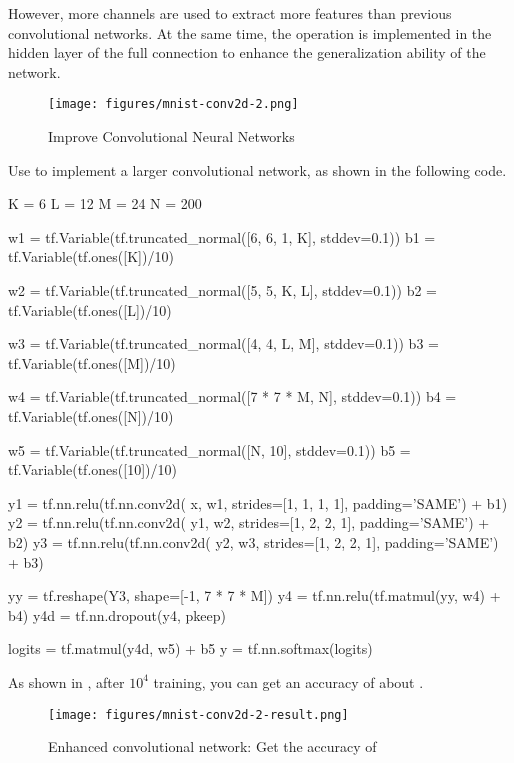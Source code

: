 \begin{content}
\begin{content}
However, more channels are used to extract more features than previous convolutional networks. At the same time, the  operation is implemented in the hidden layer of the full connection to enhance the generalization ability of the network.

\begin{figure}[H]
  \centering
  \texttt{[image: figures/mnist-conv2d-2.png]}
  \caption{Improve Convolutional Neural Networks}
  \label{fig:mnist-conv2d-2}
\end{figure}

Use \tf{} to implement a larger convolutional network, as shown in the following code.

\begin{leftbar}
\begin{python}
K = 6
L = 12
M = 24
N = 200

w1 = tf.Variable(tf.truncated_normal([6, 6, 1, K], stddev=0.1))
b1 = tf.Variable(tf.ones([K])/10)

w2 = tf.Variable(tf.truncated_normal([5, 5, K, L], stddev=0.1))
b2 = tf.Variable(tf.ones([L])/10)

w3 = tf.Variable(tf.truncated_normal([4, 4, L, M], stddev=0.1))
b3 = tf.Variable(tf.ones([M])/10)

w4 = tf.Variable(tf.truncated_normal([7 * 7 * M, N], stddev=0.1))
b4 = tf.Variable(tf.ones([N])/10)

w5 = tf.Variable(tf.truncated_normal([N, 10], stddev=0.1))
b5 = tf.Variable(tf.ones([10])/10)

y1 = tf.nn.relu(tf.nn.conv2d(
       x,  w1, strides=[1, 1, 1, 1], padding='SAME') + b1)
y2 = tf.nn.relu(tf.nn.conv2d(
       y1, w2, strides=[1, 2, 2, 1], padding='SAME') + b2)
y3 = tf.nn.relu(tf.nn.conv2d(
       y2, w3, strides=[1, 2, 2, 1], padding='SAME') + b3)

yy = tf.reshape(Y3, shape=[-1, 7 * 7 * M])
y4 = tf.nn.relu(tf.matmul(yy, w4) + b4)
y4d = tf.nn.dropout(y4, pkeep)

logits = tf.matmul(y4d, w5) + b5
y = tf.nn.softmax(logits)
\end{python}
\end{leftbar}

As shown in , after $10^4$ training, you can get an accuracy of about .

\begin{figure}[H]
  \centering
  \texttt{[image: figures/mnist-conv2d-2-result.png]}
  \caption{Enhanced convolutional network: Get the accuracy of }
  \label{fig:mnist-conv2d-2-result}
\end{figure}


\end{content}
\end{content}
